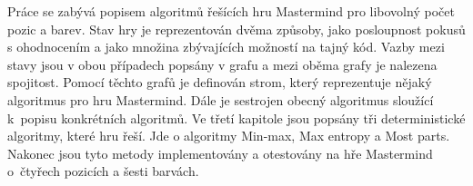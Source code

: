 \documentclass[12pt,a4paper]{article}
\begin{document}
Práce se zabývá popisem algoritmů řešících hru Mastermind pro libovolný počet pozic a barev. Stav hry je reprezentován dvěma způsoby, jako posloupnost pokusů s ohodnocením a jako množina zbývajících možností na tajný kód. Vazby mezi stavy jsou v obou případech popsány v grafu a mezi oběma grafy je nalezena spojitost. Pomocí těchto grafů je definován strom, který reprezentuje nějaký algoritmus pro hru Mastermind. Dále je sestrojen obecný algoritmus sloužící k~popisu konkrétních algoritmů. Ve třetí kapitole jsou popsány tři deterministické algoritmy, které hru řeší. Jde o algoritmy Min-max, Max entropy a Most parts. Nakonec jsou tyto metody implementovány a otestovány na hře Mastermind o~čtyřech pozicích a šesti barvách.
\end{document}
